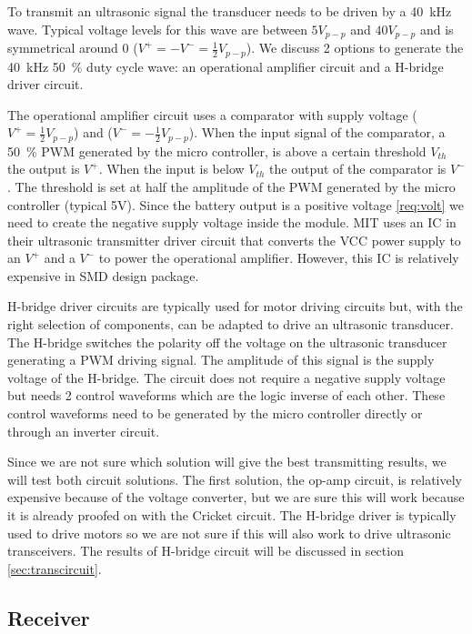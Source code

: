 To transmit an ultrasonic signal the transducer needs to be driven by a \SI{40}{\kilo\hertz} wave.
Typical voltage levels for this wave are between $5V_{p-p}$ and $40V_{p-p}$ and is symmetrical around 0 ($V^{+}=-V^{-}=\frac{1}{2}V_{p-p}$).
We discuss 2 options to generate the \SI{40}{\kilo\hertz} \SI{50}{\percent} duty cycle wave: an operational amplifier circuit and a H-bridge driver circuit.

The operational amplifier circuit uses a comparator with supply voltage ($V^{+}=\frac{1}{2}V_{p-p}$) and ($V^{-}=-\frac{1}{2}V_{p-p}$).
When the input signal of the comparator, a \SI{50}{\percent} PWM generated by the micro controller, is above a certain threshold $V_{th}$ the output is $V^{+}$.
When the input is below $V_{th}$ the output of the comparator is $V^{-}$.
The threshold is set at half the amplitude of the PWM generated by the micro controller (typical 5V).
Since the battery output is a positive voltage \ref{req:volt} we need to create the negative supply voltage inside the module.
MIT uses an IC in their ultrasonic transmitter driver circuit that converts the VCC power supply to an $V^{+}$ and a $V^{-}$ to power the operational amplifier.
However, this IC is relatively expensive in SMD design package.

H-bridge driver circuits are typically used for motor driving circuits but, with the right selection of components, can be adapted to drive an ultrasonic transducer.
The H-bridge switches the polarity off the voltage on the ultrasonic transducer generating a PWM driving signal.
The amplitude of this signal is the supply voltage of the H-bridge.
The circuit does not require a negative supply voltage but needs 2 control waveforms which are the logic inverse of each other.
These control waveforms need to be generated by the micro controller directly or through an inverter circuit.

Since we are not sure which solution will give the best transmitting results, we will test both circuit solutions. The first solution, the op-amp circuit, is relatively expensive because of the voltage converter, but we are sure this will work because it is already proofed on with the Cricket circuit. The H-bridge driver is typically used to drive motors so we are not sure if this will also work to drive ultrasonic transceivers. The results of H-bridge circuit will be discussed in section \ref{sec:transcircuit}.

\subsection{Receiver}
\label{chap:receiver}

